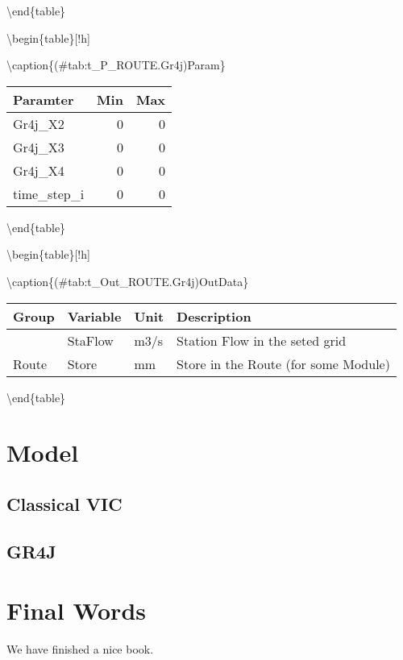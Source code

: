 \documentclass[
]{book}
\begin{document}
\textbackslash end\{table\}

\textbackslash begin\{table\}{[}!h{]}

\textbackslash caption\{(\#tab:t\_P\_ROUTE.Gr4j)Param\}
\centering

\begin{tabular}[t]{l|r|r}
\hline
Paramter & Min & Max\\
\hline
Gr4j\_X2 & 0 & 0\\
\cline{1-3}
Gr4j\_X3 & 0 & 0\\
\cline{1-3}
Gr4j\_X4 & 0 & 0\\
\cline{1-3}
time\_step\_i & 0 & 0\\
\hline
\end{tabular}

\textbackslash end\{table\}

\textbackslash begin\{table\}{[}!h{]}

\textbackslash caption\{(\#tab:t\_Out\_ROUTE.Gr4j)OutData\}
\centering

\begin{tabular}[t]{l|l|l|l}
\hline
Group & Variable & Unit & Description\\
\hline
 & StaFlow & m3/s & Station Flow in the seted grid\\
\cline{2-4}
\multirow{-2}{*}{\raggedright\arraybackslash Route} & Store & mm & Store in the Route (for some Module)\\
\hline
\end{tabular}

\textbackslash end\{table\}

\hypertarget{model}{%
\chapter{Model}\label{model}}

\hypertarget{classical-vic}{%
\section{Classical VIC}\label{classical-vic}}

\hypertarget{gr4j}{%
\section{GR4J}\label{gr4j}}

\hypertarget{final-words}{%
\chapter{Final Words}\label{final-words}}

We have finished a nice book.

  
\end{document}
